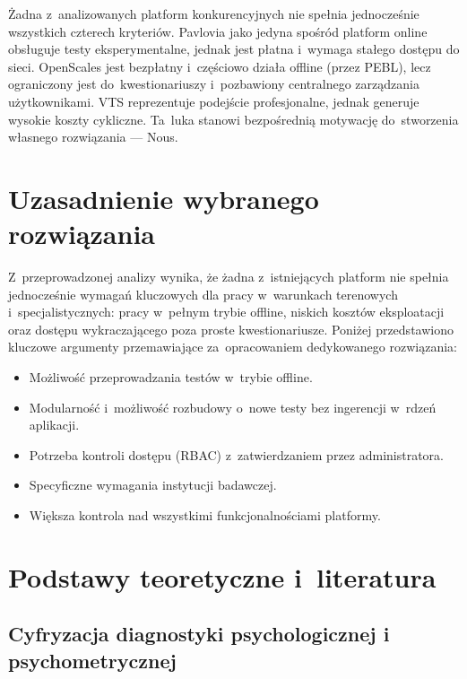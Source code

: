 \documentclass[12pt, a4paper, oneside]{report}
\begin{document}
Żadna z~analizowanych platform konkurencyjnych nie spełnia jednocześnie
wszystkich czterech kryteriów. Pavlovia jako jedyna spośród platform
online obsługuje testy eksperymentalne, jednak jest płatna i~wymaga
stałego dostępu do sieci. OpenScales jest bezpłatny i~częściowo działa
offline (przez PEBL), lecz ograniczony jest do~kwestionariuszy
i~pozbawiony centralnego zarządzania użytkownikami. VTS reprezentuje
podejście profesjonalne, jednak generuje wysokie koszty cykliczne.
Ta~luka stanowi bezpośrednią motywację do~stworzenia własnego
rozwiązania --- Nous.

\section{Uzasadnienie wybranego rozwiązania}
\label{sec:uzasadnienie}

Z~przeprowadzonej analizy wynika, że żadna z~istniejących platform nie
spełnia jednocześnie wymagań kluczowych dla pracy w~warunkach
terenowych i~specjalistycznych: pracy w~pełnym trybie offline, niskich
kosztów eksploatacji oraz dostępu wykraczającego poza proste
kwestionariusze. Poniżej przedstawiono kluczowe argumenty przemawiające
za~opracowaniem dedykowanego rozwiązania:

\begin{itemize}
	\item Możliwość przeprowadzania testów w~trybie offline.
	\item Modularność i~możliwość rozbudowy o~nowe testy bez ingerencji
	      w~rdzeń aplikacji.
	\item Potrzeba kontroli dostępu (RBAC) z~zatwierdzaniem przez
	      administratora.
	\item Specyficzne wymagania instytucji badawczej.
	\item Większa kontrola nad wszystkimi funkcjonalnościami platformy.
\end{itemize}


\section{Podstawy teoretyczne i~literatura}
\label{sec:literatura}

\subsection{Cyfryzacja diagnostyki psychologicznej i psychometrycznej}
\label{subsec:diagnostyka}
\end{document}
